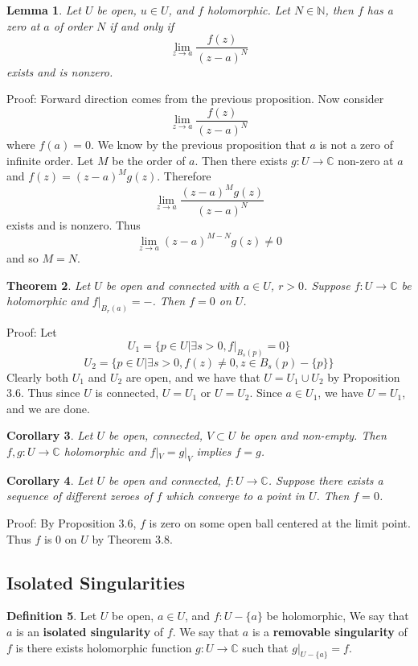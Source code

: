 \documentclass[11pt]{article}
\theoremstyle{plain}
\newtheorem{theorem}{Theorem}[section]
\newtheorem{corollary}[theorem]{Corollary}
\newtheorem{lemma}[theorem]{Lemma}
\theoremstyle{definition}
\newtheorem{definition}[theorem]{Definition}
\newcommand{\C}{\mathbb{C}}
\begin{document}
\begin{lemma}
Let $U$ be open, $u \in U$, and $f$ holomorphic. Let $N \in \mathbb{N}$, then $f$ has a zero at $a$ of order $N$ if and only if 
$$ \lim_{z\to a} \frac{f(z)}{(z-a)^N}$$
exists and is nonzero.
\end{lemma}

Proof: Forward direction comes from the previous proposition. Now consider 
$$ \lim_{z\to a} \frac{f(z)}{(z-a)^N} $$
where $f(a) = 0$. We know by the previous proposition that $a$ is not a zero of infinite order. Let $M$ be the order of $a$. Then there exists $g: U \to \C$ non-zero at $a$ and $f(z) = (z-a)^Mg(z)$. Therefore
$$ \lim_{z\to a} \frac{(z-a)^M g(z)}{(z-a)^N} $$
exists and is nonzero. Thus 
$$ \lim_{z \to a}(z-a)^{M-N}g(z) \neq 0 $$
and so $M = N$.

\begin{theorem}
Let $U$ be open and connected with $a \in U$, $r > 0$. Suppose $f:U \to \C$ be holomorphic and $f|_{B_r(a)} = -$. Then $f = 0$ on $U$.
\end{theorem}

Proof: Let 
$$U_1 = \{ p \in U | \exists s > 0, f|_{B_s(p)} = 0\}$$
$$ U_2 = \{ p \in U | \exists s > 0, f(z) \neq 0, z \in B_s(p) - \{ p \} \} $$
Clearly both $U_1$ and $U_2$ are open, and we have that $U = U_1 \cup U_2$ by Proposition 3.6. Thus since $U$ is connected, $U = U_1$ or $U = U_2$. Since $a \in U_1$, we have $U = U_1$, and we are done. 

\begin{corollary}
Let $U$ be open, connected, $V \subset U$ be open and non-empty. Then $f,g: U \to \C$ holomorphic and $f|_V = g|_V$ implies $f = g$.
\end{corollary}

\begin{corollary}
Let $U$ be open and connected, $f:U\to\C$. Suppose there exists a sequence of different zeroes of $f$ which converge to a point in $U$. Then $f = 0$. 
\end{corollary}
Proof: By Proposition 3.6, $f$ is zero on some open ball centered at the limit point. Thus $f$ is $0$ on $U$ by Theorem 3.8.

\subsection{Isolated Singularities}
\begin{definition}
Let $U$ be open, $a \in U$, and $f: U - \{ a\}$ be holomorphic, We say that $a$ is an \textbf{isolated singularity} of $f$. We say that $a$ is a \textbf{removable singularity} of $f$ is there exists holomorphic function $g: U \to \C$ such that $g | _{U - \{a\}} = f$. 
\end{definition}
\end{document}
